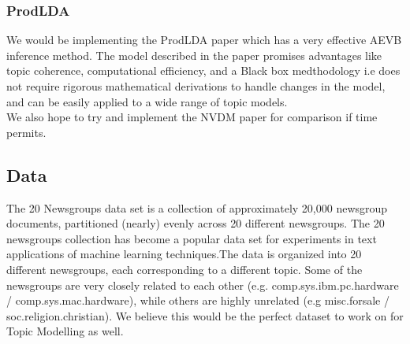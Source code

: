 \documentclass[12pt]{article}
\begin{document}
\subsubsection{ProdLDA\cite{prodlda}}
We would be implementing the ProdLDA\cite{prodlda} paper which has a very effective AEVB inference method. The model described in the paper promises advantages like topic coherence, computational efficiency, and a Black box medthodology i.e does not require rigorous mathematical derivations to handle changes in the model, and can be easily applied to a wide range of topic models.\\

We also hope to try and implement the NVDM\cite{nvdm} paper for comparison if time permits.
\subsection{Data}
The 20 Newsgroups\cite{20news} data set is a collection of approximately 20,000 newsgroup documents, partitioned (nearly) evenly across 20 different newsgroups. The 20 newsgroups collection has become a popular data set for experiments in text applications of machine learning techniques.The data is organized into 20 different newsgroups, each corresponding to a different topic. Some of the newsgroups are very closely related to each other (e.g. comp.sys.ibm.pc.hardware / comp.sys.mac.hardware), while others are highly unrelated (e.g misc.forsale / soc.religion.christian). We believe this would be the perfect dataset to work on for Topic Modelling as well.


\medskip

\printbibliography
\end{document}
